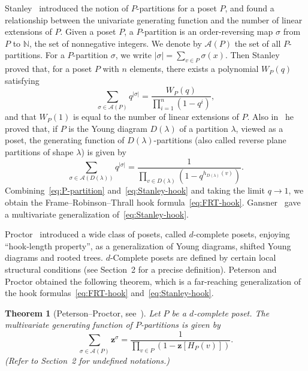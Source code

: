\documentclass[10pt]{amsart}
\newtheorem{theo}{Theorem}[section]
\theoremstyle{definition}
\theoremstyle{remark}
\newcommand\vectz{\boldsymbol{z}}
\newcommand\Nat{\mathbb{N}}
\newcommand\AP{\mathcal{A}}
\begin{document}
Stanley~\cite{Stan1} introduced the notion of $P$-partitions for a poset $P$, 
and found a relationship between the univariate generating function 
and the number of linear extensions of $P$.
Given a poset $P$, a $P$-partition is an order-reversing map $\sigma$ from $P$ to $\Nat$, 
the set of nonnegative integers.
We denote by $\AP(P)$ the set of all $P$-partitions.
For a $P$-partition $\sigma$, we write $|\sigma| = \sum_{v \in P} \sigma(x)$.
Then Stanley~\cite[Corollaries~5.3 and~5.4]{Stan1} proved that, for a poset $P$ with $n$ elements, 
there exists a polynomial $W_P(q)$ satisfying
\begin{equation}
\label{eq:P-partition}
\sum_{\sigma \in \AP(P)} q^{|\sigma|}
 =
\frac{ W_P(q) }
 { \prod_{i=1}^n (1 - q^i) },
\end{equation}
and that $W_P(1)$ is equal to the number of linear extensions of $P$.
Also in~\cite[Proposition~18.3]{Stan2} he proved that, 
if $P$ is the Young diagram $D(\lambda)$ of a partition $\lambda$, viewed as a poset, 
the generating function of $D(\lambda)$-partitions (also called reverse plane partitions of shape $\lambda$) 
is given by
\begin{equation}
\label{eq:Stanley-hook}
\sum_{\sigma \in \AP(D(\lambda))} q^{|\sigma|}
 =
\frac{ 1 }
 { \prod_{v \in D(\lambda)} (1 - q^{h_{D(\lambda)}(v)}) }.
\end{equation}
Combining~\eqref{eq:P-partition} and~\eqref{eq:Stanley-hook} and taking the limit $q \to 1$, 
we obtain the Frame--Robinson--Thrall hook formula~\eqref{eq:FRT-hook}.
Gansner~\cite[Theorem~5.1]{G} gave a multivariate generalization of~\eqref{eq:Stanley-hook}.

Proctor~\cite{Proc1, Proc2} introduced a wide class of posets, 
called $d$-complete posets, enjoying ``hook-length property'', 
as a generalization of Young diagrams, shifted Young diagrams and rooted trees.
$d$-Complete posets are defined by certain local structural conditions 
(see Section~2 for a precise definition).
Peterson and Proctor obtained the following theorem, which is a far-reaching generalization 
of the hook formulas~\eqref{eq:FRT-hook} and~\eqref{eq:Stanley-hook}.

\begin{theo}[Peterson--Proctor, see~\cite{Proc3}]
\label{thm:PP}
Let $P$ be a $d$-complete poset.
The multivari\-ate generating function of $P$-partitions is given by
\begin{equation}
\label{eq:PP-hook}
\sum_{\sigma \in \AP(P)} \vectz^{\sigma}
 =
\frac{ 1 }
 { \prod_{v \in P} (1 - \vectz[H_P(v)]) }.
\end{equation}
(Refer to Section~2 for undefined notations.)
\end{theo}
\end{document}
